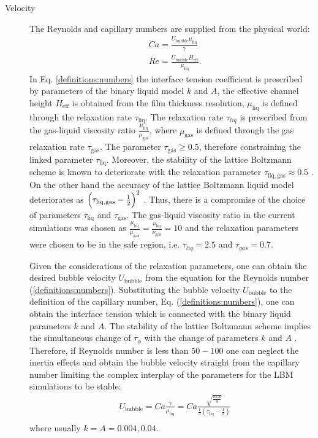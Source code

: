 \documentclass[preprint,12pt]{elsarticle}
\begin{document}
\begin{description}
\item[Velocity] The Reynolds and capillary numbers are supplied from the physical world:
\begin{equation}
\label{definitions:numbers}
\begin{aligned}
&Ca=\frac{U_{\mathrm{bubble}} \mu_{\mathrm{liq}}}{\gamma} \\
&Re=\frac{U_{\mathrm{bubble}} H_{\mathrm{eff}}}{\mu_{\mathrm{liq}}}.
\end{aligned}
\end{equation}
In Eq. \eqref{definitions:numbers} the interface tension coefficient is prescribed by parameters of
the binary liquid model $k$ and $A$, the effective channel height $H_{\mathrm{eff}}$ is obtained
from the film thickness resolution, $\mu_{\mathrm{liq}}$ is defined through the relaxation rate
$\tau_{\mathrm{liq}}$. The relaxation rate $\tau_{liq}$ is prescribed from the gas-liquid viscosity
ratio $\frac{\mu_{\mathrm{liq}}}{\mu_{\mathrm{gas}}}$, where $\mu_{\mathrm{gas}}$ is defined through
the gas relaxation rate $\tau_{\mathrm{gas}}$. The parameter $\tau_{\mathrm{gas}}\geq 0.5$, therefore
 constraining the linked parameter $\tau_{\mathrm{liq}}$. Moreover,
the stability of the lattice Boltzmann scheme is known to deteriorate with the relaxation parameter
$\tau_{\mathrm{liq},\mathrm{gas}}\approx 0.5$ \cite{kuzmin-trt-stability}. On the other hand the
accuracy of the lattice Boltzmann liquid model deteriorates as
$\Bigl(\tau_{\mathrm{liq},\mathrm{gas}}-\frac{1}{2}\Bigr)^2$ \cite{ginzburg-trt-simple-hydro}. Thus,
there is a compromise of the choice of parameters $\tau_{\mathrm{liq}}$ and $\tau_{\mathrm{gas}}$.
The gas-liquid viscosity ratio in the current simulations was chosen as
$\frac{\mu_{\mathrm{liq}}}{\mu_{\mathrm{gas}}}=\frac{\nu_{\mathrm{liq}}}{\nu_{\mathrm{gas}}}=10$ and
the relaxation parameters were chosen to be
in the safe region, i.e. $\tau_{liq}=2.5$ and $\tau_{gas}=0.7$. 

Given the considerations of the relaxation parameters, one can obtain the desired bubble velocity
$U_{\mathrm{bubble}}$ from the equation for the Reynolds number (\ref{definitions:numbers}).
Substituting the bubble velocity $U_{\mathrm{bubble}}$ to the definition of the capillary number,
Eq. (\ref{definitions:numbers}), one can obtain the interface tension which is connected with the
binary liquid parameters $k$ and $A$. The stability of the lattice Boltzmann scheme implies the
simultaneous change of $\tau_{\phi}$ with the change of parameters $k$ and $A$
\cite{pagonabarraga-parameters}. Therefore, if Reynolds number is less than
$50-100$ one can neglect the inertia effects and obtain the bubble velocity straight from the
capillary number limiting the complex interplay of the parameters for the LBM simulations to be
stable: 
\begin{equation}
\begin{aligned}
&U_{\mathrm{bubble}}=Ca \frac{\gamma}{\mu_{\mathrm{liq}}}=Ca \frac{\sqrt{\frac{8 k
A}{9}}}{\frac{1}{3}(\tau_{\mathrm{liq}}-\frac{1}{2})}\\
\end{aligned}
\end{equation}
where usually $k=A=0.004,0.04$.


\end{description}
\end{document}
